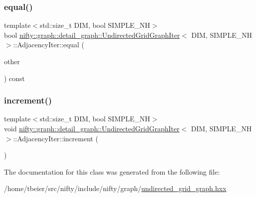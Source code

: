 \subsubsection{\texorpdfstring{equal()}{equal()}}
{\footnotesize\ttfamily template$<$std\+::size\+\_\+t D\+IM, bool S\+I\+M\+P\+L\+E\+\_\+\+NH$>$ \\
bool \hyperlink{classnifty_1_1graph_1_1detail__graph_1_1UndirectedGridGraphIter}{nifty\+::graph\+::detail\+\_\+graph\+::\+Undirected\+Grid\+Graph\+Iter}$<$ D\+IM, S\+I\+M\+P\+L\+E\+\_\+\+NH $>$\+::Adjacency\+Iter\+::equal (\begin{DoxyParamCaption}\item[{const \hyperlink{classnifty_1_1graph_1_1detail__graph_1_1UndirectedGridGraphIter_1_1AdjacencyIter}{Adjacency\+Iter} \&}]{other }\end{DoxyParamCaption}) const\hspace{0.3cm}{\ttfamily [inline]}}

\mbox{\label{classnifty_1_1graph_1_1detail__graph_1_1UndirectedGridGraphIter_1_1AdjacencyIter_ad6a4c23c77e26cd510a5e123eb39ad8e}} 
\subsubsection{\texorpdfstring{increment()}{increment()}}
{\footnotesize\ttfamily template$<$std\+::size\+\_\+t D\+IM, bool S\+I\+M\+P\+L\+E\+\_\+\+NH$>$ \\
void \hyperlink{classnifty_1_1graph_1_1detail__graph_1_1UndirectedGridGraphIter}{nifty\+::graph\+::detail\+\_\+graph\+::\+Undirected\+Grid\+Graph\+Iter}$<$ D\+IM, S\+I\+M\+P\+L\+E\+\_\+\+NH $>$\+::Adjacency\+Iter\+::increment (\begin{DoxyParamCaption}{ }\end{DoxyParamCaption})\hspace{0.3cm}{\ttfamily [inline]}}



The documentation for this class was generated from the following file\+:\begin{DoxyCompactItemize}
\item 
/home/tbeier/src/nifty/include/nifty/graph/\hyperlink{graph_2undirected__grid__graph_8hxx}{undirected\+\_\+grid\+\_\+graph.\+hxx}\end{DoxyCompactItemize}
